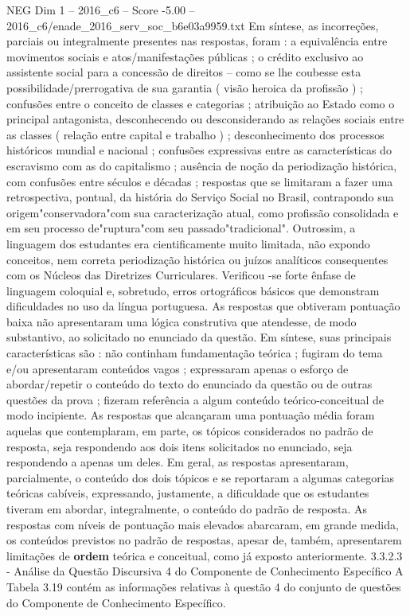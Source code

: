 \begin{textsample}{NEG Dim 1 – 2016\_c6 – Score -5.00 – 2016\_c6/enade\_2016\_serv\_soc\_b6e03a9959.txt}
Em síntese, as incorreções, parciais ou integralmente presentes nas respostas, foram : a equivalência entre movimentos sociais e atos/manifestações públicas ; o crédito exclusivo ao assistente social para a concessão de direitos – como se lhe coubesse esta possibilidade/prerrogativa de sua garantia ( visão heroica da profissão ) ; confusões entre o conceito de classes e categorias ; atribuição ao Estado como o principal antagonista, desconhecendo ou desconsiderando as relações sociais entre as classes ( relação entre capital e trabalho ) ; desconhecimento dos processos históricos mundial e nacional ; confusões expressivas entre as características do escravismo com as do capitalismo ; ausência de noção da periodização histórica, com confusões entre séculos e décadas ; respostas que se limitaram a fazer uma retrospectiva, pontual, da história do Serviço Social no Brasil, contrapondo sua origem"conservadora"com sua caracterização atual, como profissão consolidada e em seu processo de"ruptura"com seu passado"tradicional".
Outrossim, a linguagem dos estudantes era cientificamente muito limitada, não expondo conceitos, nem correta periodização histórica ou juízos analíticos consequentes com os Núcleos das Diretrizes Curriculares.
Verificou -se forte ênfase de linguagem coloquial e, sobretudo, erros ortográficos básicos que demonstram dificuldades no uso da língua portuguesa.
As respostas que obtiveram pontuação baixa não apresentaram uma lógica construtiva que atendesse, de modo substantivo, ao solicitado no enunciado da questão.
Em síntese, suas principais características são : não continham fundamentação teórica ; fugiram do tema e/ou apresentaram conteúdos vagos ; expressaram apenas o esforço de abordar/repetir o conteúdo do texto do enunciado da questão ou de outras questões da prova ; fizeram referência a algum conteúdo teórico-conceitual de modo incipiente.
As respostas que alcançaram uma pontuação média foram aquelas que contemplaram, em parte, os tópicos considerados no padrão de resposta, seja respondendo aos dois itens solicitados no enunciado, seja respondendo a apenas um deles.
Em geral, as respostas apresentaram, parcialmente, o conteúdo dos dois tópicos e se reportaram a algumas categorias teóricas cabíveis, expressando, justamente, a dificuldade que os estudantes tiveram em abordar, integralmente, o conteúdo do padrão de resposta.
As respostas com níveis de pontuação mais elevados abarcaram, em grande medida, os conteúdos previstos no padrão de respostas, apesar de, também, apresentarem limitações de \textbf{ordem} teórica e conceitual, como já exposto anteriormente. 3.3.2.3 - Análise da Questão Discursiva 4 do Componente de Conhecimento Específico A Tabela 3.19 contém as informações relativas à questão 4 do conjunto de questões do Componente de Conhecimento Específico.

\end{textsample}
